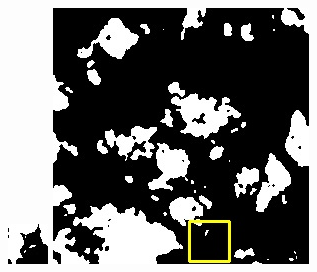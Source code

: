 \documentclass[UTF8]{ctexart}
\begin{document}
\begin{figure}[H]
{\begin{minipage}[b]{0.15\linewidth}
            \includegraphics[width=1\linewidth]{../log/spoon2/cut/tmp_cut_LC80350192014190LGN00_06561_unet.jpg}\vspace{4pt}
            \includegraphics[width=1\linewidth]{../log/spoon2/cut/LC80980712014024LGN00_15443_unet.jpg}\vspace{4pt}

\end{minipage}}
\end{figure}
\end{document}
